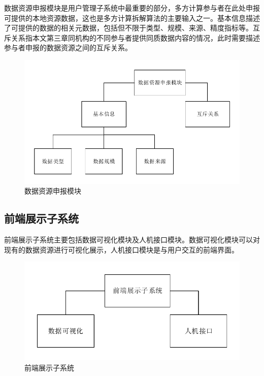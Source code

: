 \documentclass[promaster]{thesis-uestc}
\begin{document}
数据资源申报模块是用户管理子系统中最重要的部分，多方计算参与者在此处申报可提供的本地资源数据，这也是多方计算拆解算法的主要输入之一。基本信息描述了可提供的数据的相关元数据，包括但不限于类型、规模、来源、精度指标等。互斥关系指本文第三章同机构的不同参与者提供同质数据内容的情况，此时需要描述参与者申报的数据资源之间的互斥关系。

\begin{figure}[H]
    \includegraphics[width=350pt]{pic/application.pdf}
    \caption{数据资源申报模块}
\end{figure}

\subsection{前端展示子系统}
前端展示子系统主要包括数据可视化模块及人机接口模块。数据可视化模块可以对现有的数据资源进行可视化展示，人机接口模块是与用户交互的前端界面。

\begin{figure}[H]
    \includegraphics[width=350pt]{pic/qianduan.pdf}
    \caption{前端展示子系统}
\end{figure}
\end{document}
